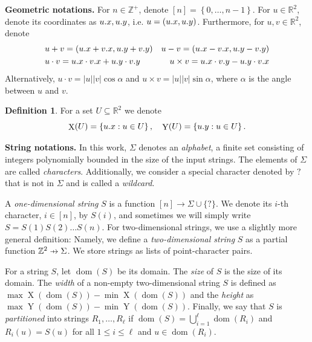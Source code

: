 \documentclass[11pt, letterpaper]{article}
\theoremstyle{plain}
\theoremstyle{definition}
\newtheorem{definition}{Definition}
\theoremstyle{remark}
\newcommand{\R}{\mathbb{R}}
\newcommand{\Z}{\mathbb{Z}}
\newcommand{\set}[1]{\left\lbrace #1 \right\rbrace}
\DeclareMathOperator*{\X}{X}
\DeclareMathOperator*{\Y}{Y}
\DeclareMathOperator*{\dom}{dom}
\DeclareMathOperator*{\chrome}{C}
\newcommand{\absolute}[1]{\left\lvert#1\right\rvert}
\begin{document}
\textbf{Geometric notations.} For $n \in \Z^+$, denote $[n] = \set{0, \dots, n - 1}$. For $u \in \R^2$, denote its coordinates as $u.x, u.y$, i.e. $u = (u.x, u.y)$. Furthermore, for $u, v \in \R^2$, denote 
\begin{align*}
&u + v = (u.x+v.x, u.y + v.y)  & u - v = (u.x-v.x, u.y-v.y)\\
&u \cdot v = u.x \cdot v.x + u.y \cdot v.y  & u \times v = u.x \cdot v.y - u.y \cdot v.x
\end{align*}
Alternatively, $u \cdot v = \absolute{u}\absolute{v} \cos \alpha$ and $u \times v = \absolute{u}\absolute{v} \sin \alpha$, where $\alpha$ is the angle between $u$ and $v$.

\begin{definition}
	For a set $U \subseteq \R^2$ we denote
	\[ \X(U) = \set{\x{u} : u \in U}, \quad \Y(U) = \set{\y{u} : u \in U}.\]
\end{definition}


\newcommand{\wild}{\texttt{?}}
\noindent \textbf{String notations.} In this work, $\Sigma$ denotes an \emph{alphabet}, a finite set consisting of integers polynomially bounded in the size of the input strings. The elements of $\Sigma$ are called \emph{characters}. Additionally, we consider a special character denoted by $\wild$ that is not in $\Sigma$ and is called a \emph{wildcard}.

\newcommand{\getchar}[1]{\chrome(#1)}
\newcommand{\pto}{\mathrel{\ooalign{\hfil$\mapstochar\mkern5mu$\hfil\cr$\to$\cr}}}
\renewcommand{\d}[1]{\dom(#1)}
\newcommand{\f}[1]{#1^\mathbf{f}}

A \emph{one-dimensional string} $S$ is a function $[n] \rightarrow \Sigma \cup \{\wild\}$. We denote its $i$-th character, $i \in [n]$, by $S(i)$, and sometimes we will simply write $S = S(1) S(2) \ldots S(n)$. For two-dimensional strings, we use a slightly more general definition: Namely, we define a \emph{two-dimensional string} $S$ as a partial function $\Z^2 \pto \Sigma$. We store strings as lists of point-character pairs. 

For a string $S$, let $\d{S}$ be its domain. The \emph{size} of $S$ is the size of its domain. The \emph{width} of a non-empty two-dimensional string $S$ is defined as $\max \X(\d{S}) - \min \X(\d{S})$ and the \emph{height} as $\max \Y(\d{S}) - \min \Y(\d{S})$. Finally, we say that $S$ is \emph{partitioned} into strings $R_1, \dots, R_\ell$ if $\d{S} = \bigcup_{i = 1}^\ell \d{R_i}$ and $R_i(u) = S(u)$ for all $1 \le i \le \ell$ and $u \in \d{R_i}$.
\end{document}
